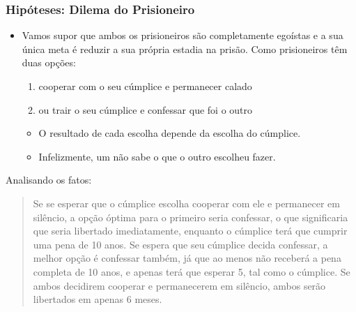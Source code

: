 \begin{frame}

    \frametitle{Hipóteses: Dilema do Prisioneiro}
    
    
    \begin{itemize}
      \item  Vamos supor que ambos os prisioneiros são completamente egoístas e a sua única meta é reduzir a sua própria estadia na prisão. Como prisioneiros têm duas opções:
      
      \begin{enumerate}
         \item cooperar com o seu cúmplice e permanecer calado
         \item ou trair o seu cúmplice e confessar que foi o outro
       \end{enumerate}   
       
       \begin{itemize}
         \item   O resultado de cada escolha depende da escolha do cúmplice.     
         \item Infelizmente, um não sabe o que o outro escolheu fazer. 
       \end{itemize}
      

    
    
    
    \end{itemize}

Analisando os fatos:
\begin{quotation}
Se se esperar que o cúmplice escolha cooperar com ele e permanecer em silêncio, a opção óptima para o primeiro seria confessar, o que significaria que seria libertado imediatamente, enquanto o cúmplice terá que cumprir uma pena de 10 anos. Se espera que seu cúmplice decida confessar, a melhor opção é confessar também, já que ao menos não receberá a pena completa de 10 anos, e apenas terá que esperar 5, tal como o cúmplice. Se ambos decidirem cooperar e permanecerem em silêncio, ambos serão libertados em apenas 6 meses.
\end{quotation}

\end{frame}



